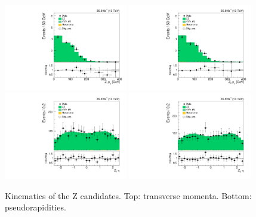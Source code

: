 \begin{figure}[!b]
\centering
\includegraphics[width=0.48\textwidth]{figures/dibosons/zz4l/pTZ1.pdf}
\includegraphics[width=0.48\textwidth]{figures/dibosons/zz4l/pTZ2.pdf}
\includegraphics[width=0.48\textwidth]{figures/dibosons/zz4l/etaZ1.pdf}
\includegraphics[width=0.48\textwidth]{figures/dibosons/zz4l/etaZ2.pdf}
\caption{Kinematics of the Z candidates. Top: transverse momenta. Bottom: pseudorapidities.
\label{fig:zz4l_zpt}}
\end{figure}

